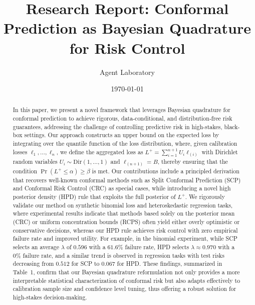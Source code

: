 \documentclass{article}
\title{Research Report: Conformal Prediction as Bayesian Quadrature for Risk Control}
\author{Agent Laboratory}
\date{\today}
\begin{document}
\maketitle

\begin{abstract}
In this paper, we present a novel framework that leverages Bayesian quadrature for conformal prediction to achieve rigorous, data-conditional, and distribution‐free risk guarantees, addressing the challenge of controlling predictive risk in high-stakes, black-box settings. Our approach constructs an upper bound on the expected loss by integrating over the quantile function of the loss distribution, where, given calibration losses $\ell_1, \dots, \ell_n$, we define the aggregated loss as $L^+ = \sum_{i=1}^{n+1} U_i \ell_{(i)}$ with Dirichlet random variables $U_i \sim \text{Dir}(1,\ldots,1)$ and $\ell_{(n+1)} = B$, thereby ensuring that the condition $\Pr(L^+ \leq \alpha) \geq \beta$ is met. Our contributions include a principled derivation that recovers well-known conformal methods such as Split Conformal Prediction (SCP) and Conformal Risk Control (CRC) as special cases, while introducing a novel high posterior density (HPD) rule that exploits the full posterior of $L^+$. We rigorously validate our method on synthetic binomial loss and heteroskedastic regression tasks, where experimental results indicate that methods based solely on the posterior mean (CRC) or uniform concentration bounds (RCPS) often yield either overly optimistic or conservative decisions, whereas our HPD rule achieves risk control with zero empirical failure rate and improved utility. For example, in the binomial experiment, while SCP selects an average $\lambda$ of $0.596$ with a $61.6\%$ failure rate, HPD selects $\lambda \approx 0.970$ with a $0\%$ failure rate, and a similar trend is observed in regression tasks with test risks decreasing from $0.512$ for SCP to $0.067$ for HPD. These findings, summarized in Table~1, confirm that our Bayesian quadrature reformulation not only provides a more interpretable statistical characterization of conformal risk but also adapts effectively to calibration sample size and confidence level tuning, thus offering a robust solution for high-stakes decision-making.
\end{abstract}
\end{document}
